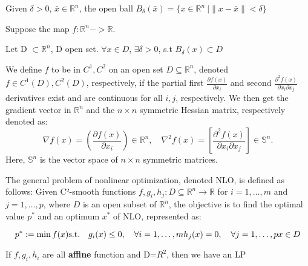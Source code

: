\begin{definition}
    Given $\delta > 0$, $\bar{x}\in \mathbb{R}^n$, the open ball $B_{\delta}(\bar{x})=\{x \in \mathbb{R}^n\ | \|x-\bar{x}\|< \delta\}$
    
\end{definition}

\begin{definition}[map]
    Suppose the map $f:\mathbb{R}^n -> \mathbb{R}$.
\end{definition}

\begin{definition}
    Let D $\subset \mathbb{R}^n$, D open set. $\forall x \in D$, $\exists \delta >0$, s.t $B_{\delta}(x)\subset D$
\end{definition}

\begin{definition}[differ]
    We define \(f\) to be in \(C^1, C^2\) on an open set \(D \subseteq \mathbb{R}^n\), denoted \(f \in C^1(D), C^2(D)\), respectively, if the partial first \(\frac{\partial f(x)}{\partial x_i}\) and second \(\frac{\partial^2 f(x)}{\partial x_i \partial x_j}\) derivatives exist and are continuous for all \(i, j\), respectively. We then get the gradient vector in \(\mathbb{R}^n\) and the \(n \times n\) symmetric Hessian matrix, respectively denoted as:
\[
\nabla f(x) = \left( \frac{\partial f(x)}{\partial x_i} \right) \in \mathbb{R}^n, \quad \nabla^2 f(x) = \left[ \frac{\partial^2 f(x)}{\partial x_i \partial x_j} \right] \in \mathbb{S}^n.
\]
Here, \(\mathbb{S}^n\) is the vector space of \(n \times n\) symmetric matrices.

\end{definition}


\begin{definition}
    The general problem of nonlinear optimization, denoted NLO, is defined as follows: Given C²-smooth functions
\(f, g_i, h_j : D \subseteq \mathbb{R}^n \rightarrow \mathbb{R}\) for \(i = 1, \ldots, m\) and \(j = 1, \ldots, p\), where \(D\) is an open subset of \(\mathbb{R}^n\), the objective is to find the optimal value \(p^*\) and an optimum \(x^*\) of NLO, represented as:

\[
p^* := \min f(x) \\
\text{s.t.} \quad g_i(x) \leq 0, \quad \forall i = 1, \ldots, m \\
h_j(x) = 0, \quad \forall j = 1, \ldots, p \\
x \in D
\]

If $f,g_i,h_i$ are all \textbf{affine} function and D=$R^2$, then we have an LP
\end{definition}

